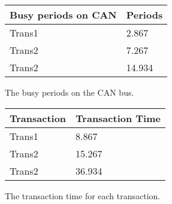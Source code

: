     \renewcommand{\arraystretch}{1.4}
    \begin{figure}[H]
    \centering
    \begin{minipage}{0.5\textwidth}
        \begin{table}[H]
        \centering
        \begin{tabular}{|l|l|}
            \hline
            \rowcolor{green!40}\textbf{Busy periods on CAN}  & \textbf{Periods} \\ \hline
            Trans1                                  & 2.867                     \\ \hline
            Trans2                                  & 7.267                     \\ \hline
            Trans2                                  & 14.934                    \\ \hline
        \end{tabular}
        \end{table}
    \end{minipage}%
    \caption{The busy periods on the CAN bus.}
    \label{fig:busyperiods}
    \end{figure}
    \renewcommand{\arraystretch}{1.0}

    \renewcommand{\arraystretch}{1.4}
    \begin{figure}[H]
    \centering
    \begin{minipage}{0.5\textwidth}
        \begin{table}[H]
        \centering
        \begin{tabular}{|l|l|}
            \hline
            \rowcolor{green!40}\textbf{Transaction}  & \textbf{Transaction Time} \\ \hline
            Trans1                                  & 8.867                     \\ \hline
            Trans2                                  & 15.267                    \\ \hline
            Trans2                                  & 36.934                    \\ \hline
        \end{tabular}
        \end{table}
    \end{minipage}%
    \caption{The transaction time for each transaction.}
    \label{fig:transactiontime}
    \end{figure}
    \renewcommand{\arraystretch}{1.0}
